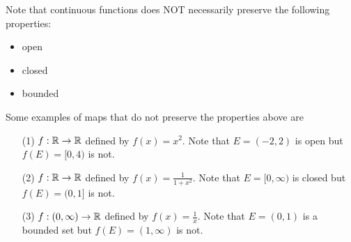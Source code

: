\documentclass[a4paper]{article}
\begin{document}
Note that continuous functions does NOT necessarily preserve the following properties:
\begin{itemize}
    \item open
    \item closed
    \item bounded
\end{itemize}

Some examples of maps that do not preserve the properties above are

\begin{enumerate}
    \item[(1)] \( f: \mathbb{R} \to \mathbb{R}  \) defined by \( f(x) = x^{2} \). Note that \( E = (-2,2) \) is open but \( f(E) = [0,4) \) is not.
    \item[(2)] \( f: \mathbb{R} \to \mathbb{R}  \) defined by \( f(x) = \frac{ 1  }{  1 + x^{2} }  \). Note that \( E = [0,\infty)  \) is closed but \( f(E) = (0,1] \) is not.
    \item[(3)] \( f: (0,\infty ) \to \mathbb{R}  \) defined by \( f(x) = \frac{ 1 }{ x }  \). Note that \( E = (0,1) \) is a bounded set but \( f(E) = (1,\infty  ) \) is not.
\end{enumerate} 
\end{document}
